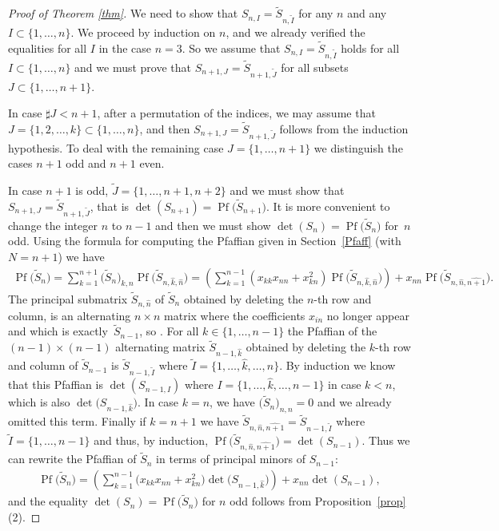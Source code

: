 \documentclass[pdftex]{sigma}
\newcommand{\tI}{{\tilde{I}}}
\newcommand{\tJ}{{\tilde{J}}}
\newcommand{\tS}{{\tilde{S}}}
\numberwithin{equation}{section}
\begin{document}
\begin{proof}[Proof of Theorem \ref{thm}] %
We need to show that $S_{n,I} = \tS_{n,\tI}$ for any $n$ and any $I \subset\{1,\ldots,n\}$. We proceed by induction on $n$, and we already verified the equalities for all $I$ in the case $n=3$. So we assume that $S_{n,I} = \tS_{n,\tI}$ holds for all $I\subset \{1,\ldots,n\}$ and we must prove that $S_{n+1,J} = \tS_{n+1,\tJ}$ for all subsets $J\subset\{1,\ldots,n+1\}$.

In case $\sharp J<n+1$, after a permutation of the indices, we may assume that $J=\{1,2,\ldots,k\}\subset\{1,\ldots,n\}$, and then $S_{n+1,J} = \tS_{n+1,\tJ}$ follows from the induction hypothesis. To deal with the remaining case $J=\{1,\ldots,n+1\}$ we distinguish the cases $n+1$ odd and $n+1$ even.

In case $n+1$ is odd, $\tilde{J}=\{1,\ldots,n+1,n+2\}$ and we must show that $S_{n+1,{J}}=\tS_{n+1,\tilde{J}}$, that is $\det(S_{n+1})=\operatorname{Pf}\big(\tS_{n+1}\big)$. It is more convenient to change the integer $n$ to $n-1$ and then we must show $\det(S_{n})=\operatorname{Pf}\big(\tS_{n}\big)$ for~$n$ odd. Using the formula for computing the Pfaffian given in Section~\ref{Pfaff} (with $N=n+1$) we have
\begin{gather*}
\operatorname{Pf}\big(\tS_{n}\big) = \sum_{k=1}^{n+1}\big(\tS_n\big)_{k,n}\operatorname{Pf}\big(\tS_{n,\hat{k},\hat{n}}\big)
 = \left(\sum_{k=1}^{n-1} (x_{kk}x_{nn}+x_{kn}^2)\operatorname{Pf}\big(\tS_{n,\hat{k},\hat{n}}\big)\right)
 + x_{nn}\operatorname{Pf}\big(\tS_{n,\hat{n},\widehat{n+1}}\big).
\end{gather*}
The principal submatrix $\tS_{n,\hat{n}}$ of $\tS_n$ obtained by deleting the $n$-th row and column, is an alterna\-ting $n\times n$ matrix where the coefficients $x_{in}$ no longer appear and which is exactly~$\tS_{n-1}$, so \smash{$\tS_{n,\hat{n}}=\tS_{n-1}$}. For all $k\in \{1,\ldots,n-1\}$ the Pfaffian of the $(n-1)\times (n-1)$ alter\-na\-ting matrix $\tS_{n-1,\hat{k}}$ obtained by deleting the $k$-th row and column of $\tS_{n-1}$ is $\tS_{n-1,\tI}$ where $\tI=\big\{1,\ldots,\hat{k},\ldots,n\big\}$. By induction we know that this Pfaffian is $\det(S_{n-1,I})$ where $I=\big\{1,\ldots,\hat{k},\ldots,n-1\big\}$ in case $k<n$, which is also $\det\big(S_{n-1,\hat{k}}\big)$. In case $k=n$, we have $\big(\tS_n\big)_{n,n}=0$ and we already omitted this term. Finally if $k=n+1$ we have $\tS_{n,\hat{n},\widehat{n+1}}=\tS_{n-1,\tI}$ where $\tI=\{1,\ldots,n-1\}$ and thus, by induction, $\operatorname{Pf}\big(\tS_{n,\hat{n},\widehat{n+1}}\big)=\det(S_{n-1})$. Thus we can rewrite the Pfaffian of $\tS_n$ in terms of principal minors of $S_{n-1}$:
\begin{gather*}
\operatorname{Pf}\big(\tS_{n}\big) =\left(\sum_{k=1}^{n-1} \big(x_{kk}x_{nn}+x_{kn}^2\big)\det\big(S_{n-1,\hat{k}}\big)\right) + x_{nn}\det(S_{n-1}),
\end{gather*}
and the equality $\det(S_n)=\operatorname{Pf}\big(\tS_{n}\big)$ for $n$ odd follows from Proposition~\ref{prop}(2).


\end{proof}
\end{document}

